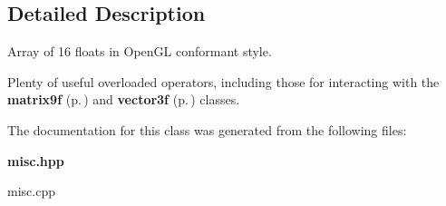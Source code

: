 \subsection{Detailed Description}
Array of 16 floats in Open\-GL conformant style.

Plenty of useful overloaded operators, including those for interacting with the {\bf matrix9f} {\rm (p.\,\pageref{classmatrix9f})} and {\bf vector3f} {\rm (p.\,\pageref{classvector3f})} classes. 



The documentation for this class was generated from the following files:\begin{CompactItemize}
\item 
{\bf misc.hpp}\item 
misc.cpp\end{CompactItemize}
